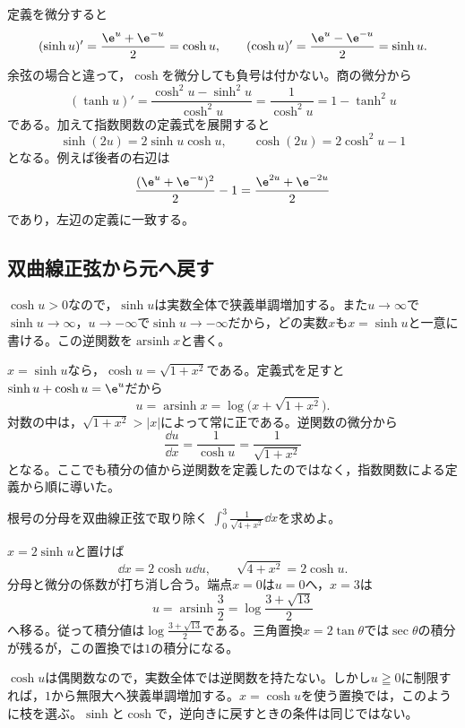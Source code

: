 定義を微分すると
\[
(\sinh u)'=\frac{\e^u+\e^{-u}}2=\cosh u,
\qquad
(\cosh u)'=\frac{\e^u-\e^{-u}}2=\sinh u.
\]
余弦の場合と違って，$\cosh$を微分しても負号は付かない。商の微分から
\begin{equation}\label{式:双曲線正接の微分}
(\tanh u)'=\frac{\cosh^2u-\sinh^2u}{\cosh^2u}
=\frac1{\cosh^2u}=1-\tanh^2u
\end{equation}
である。加えて指数関数の定義式を展開すると
\begin{equation}\label{式:双曲線の二倍公式}
\sinh(2u)=2\sinh u\cosh u,\qquad
\cosh(2u)=2\cosh^2u-1
\end{equation}
となる。例えば後者の右辺は
\[
\frac{(\e^u+\e^{-u})^2}{2}-1
=\frac{\e^{2u}+\e^{-2u}}2
\]
であり，左辺の定義に一致する。

\subsection{双曲線正弦から元へ戻す}

$\cosh u>0$なので，$\sinh u$は実数全体で狭義単調増加する。また$u\to\infty$で$\sinh u\to\infty$，$u\to-\infty$で$\sinh u\to-\infty$だから，どの実数$x$も$x=\sinh u$と一意に書ける。この逆関数を$\operatorname{arsinh}x$と書く。

$x=\sinh u$なら，$\cosh u=\sqrt{1+x^2}$である。定義式を足すと$\sinh u+\cosh u=\e^u$だから
\begin{equation}\label{式:逆双曲線正弦}
u=\operatorname{arsinh}x=\log\bigl(x+\sqrt{1+x^2}\bigr).
\end{equation}
対数の中は，$\sqrt{1+x^2}>|x|$によって常に正である。逆関数の微分から
\[
\frac{\dd u}{\dd x}=\frac1{\cosh u}
=\frac1{\sqrt{1+x^2}}
\]
となる。ここでも積分の値から逆関数を定義したのではなく，指数関数による定義から順に導いた。

\begin{example}{根号の分母を双曲線正弦で取り除く}
$\int_0^3\frac1{\sqrt{4+x^2}}\dd x$を求めよ。
\end{example}

$x=2\sinh u$と置けば
\[
\dd x=2\cosh u\dd u,\qquad
\sqrt{4+x^2}=2\cosh u.
\]
分母と微分の係数が打ち消し合う。端点$x=0$は$u=0$へ，$x=3$は
\[
u=\operatorname{arsinh}\frac32
=\log\frac{3+\sqrt{13}}2
\]
へ移る。従って積分値は$\log\frac{3+\sqrt{13}}2$である。三角置換$x=2\tan\theta$では$\sec\theta$の積分が残るが，この置換では$1$の積分になる。

$\cosh u$は偶関数なので，実数全体では逆関数を持たない。しかし$u\geqq0$に制限すれば，$1$から無限大へ狭義単調増加する。$x=\cosh u$を使う置換では，このように枝を選ぶ。$\sinh$と$\cosh$で，逆向きに戻すときの条件は同じではない。

